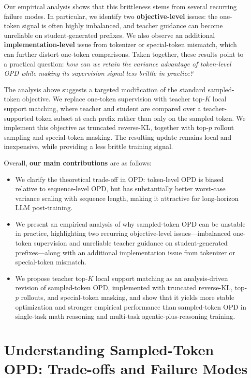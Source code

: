 \documentclass{article}
\begin{document}
Our empirical analysis shows that this brittleness stems from several recurring failure modes. In particular, we identify two \textbf{objective-level} issues: the one-token signal is often highly imbalanced, and teacher guidance can become unreliable on student-generated prefixes. We also observe an additional \textbf{implementation-level} issue from tokenizer or special-token mismatch, which can further distort one-token comparisons. Taken together, these results point to a practical question: \textit{how can we retain the variance advantage of token-level OPD while making its supervision signal less brittle in practice?}

The analysis above suggests a targeted modification of the standard sampled-token objective. We replace one-token supervision with teacher top-$K$ local support matching, where teacher and student are compared over a teacher-supported token subset at each prefix rather than only on the sampled token. We implement this objective as truncated reverse-KL, together with top-$p$ rollout sampling and special-token masking. The resulting update remains local and inexpensive, while providing a less brittle training signal.

Overall, \textbf{our main contributions} are as follows:
\begin{itemize}
    \item We clarify the theoretical trade-off in OPD: token-level OPD is biased relative to sequence-level OPD, but has substantially better worst-case variance scaling with sequence length, making it attractive for long-horizon LLM post-training.
    \item We present an empirical analysis of why sampled-token OPD can be unstable in practice, highlighting two recurring objective-level issues---imbalanced one-token supervision and unreliable teacher guidance on student-generated prefixes---along with an additional implementation issue from tokenizer or special-token mismatch.
    \item We propose teacher top-$K$ local support matching as an analysis-driven revision of sampled-token OPD, implemented with truncated reverse-KL, top-$p$ rollouts, and special-token masking, and show that it yields more stable optimization and stronger empirical performance than sampled-token OPD in single-task math reasoning and multi-task agentic-plus-reasoning training.
\end{itemize}

\section{Understanding Sampled-Token OPD: Trade-offs and Failure Modes}
\label{sec:revisiting_opd}
\end{document}
